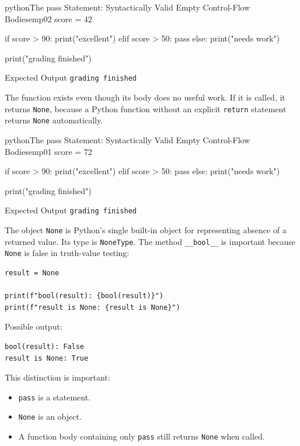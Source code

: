 \begin{codebox}[]{python}{The pass Statement: Syntactically Valid Empty Control-Flow Bodies}{emp02}
score = 42

if score > 90:
    print("excellent")
elif score > 50:
    pass
else:
    print("needs work")

print("grading finished")
\end{codebox}


\begin{iobox}{Expected Output}
\texttt{grading finished} \\
\end{iobox}




The function exists even though its body does no useful work. If it is called, it returns \texttt{None}, because a Python function without an explicit \texttt{return} statement returns \texttt{None} automatically.

\begin{codebox}[]{python}{The pass Statement: Syntactically Valid Empty Control-Flow Bodies}{emp01}
score = 72

if score > 90:
    print("excellent")
elif score > 50:
    pass
else:
    print("needs work")

print("grading finished")
\end{codebox}


\begin{iobox}{Expected Output}
\texttt{grading finished} \\
\end{iobox}




The object \texttt{None} is Python's single built-in object for representing absence of a returned value. Its type is \texttt{NoneType}. The method \texttt{\_\_bool\_\_} is important because \texttt{None} is false in truth-value testing:

\begin{verbatim}
result = None

print(f"bool(result): {bool(result)}")
print(f"result is None: {result is None}")
\end{verbatim}

Possible output:

\begin{verbatim}
bool(result): False
result is None: True
\end{verbatim}

This distinction is important:

\begin{itemize}
    \item \texttt{pass} is a statement.
    \item \texttt{None} is an object.
    \item A function body containing only \texttt{pass} still returns \texttt{None} when called.
\end{itemize}

